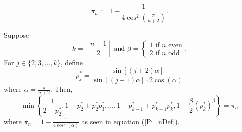 \documentclass[10pt,a4paper]{amsart}
\begin{document}
    \begin{equation}\label{Pi_nDef}
        \pi_n := 1-\frac{1}{4\cos^2\left( \frac{\pi}{n+2} \right)}.
    \end{equation}

\begin{lemma}\label{U(*)=Pi_n}
    Suppose
    $$k = \left\lfloor \frac{n-1}{2} \right\rfloor \text{ and } \beta = \begin{cases} 1 \text{ if } n \text{ even} \\ 2 \text{ if } n \text{ odd} \end{cases}.$$
    For $j\in \{2,3,\dots,k \}$, define
    $$p_j^* = \frac{\sin[(j+2)\alpha]}{\sin[(j+1)\alpha]\cdot 2 \cos(\alpha)}$$
    where $\alpha= \frac{\pi}{n+2}$. Then,
    $$\min \left\{ \frac{1}{2-p_2^*},1-p_2^*+p_2^*p_3^*, \dots, 1-p_{k-1}^*+p_{k-1}^*p_{k}^*, 1-\frac{\beta}{2}(p_k^*)^\beta \right\} = \pi_n$$
    where $\pi_n = 1-\frac{1}{4\cos^2(\alpha)}$ as seen in equation (\ref{Pi_nDef}).
\end{lemma}
\end{document}
